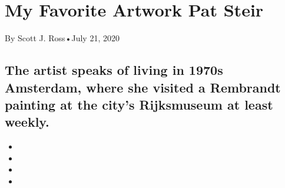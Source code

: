 \hypertarget{my-favorite-artwork--pat-steir-1}{%
\section{My Favorite Artwork \textbar{} Pat
Steir}\label{my-favorite-artwork--pat-steir-1}}

By Scott J. Ross•July 21, 2020

\hypertarget{the-artist-speaks-of-living-in-1970s-amsterdam-where-she-visited-a-rembrandt-painting-at-the-citys-rijksmuseum-at-least-weekly-1}{%
\subsection{The artist speaks of living in 1970s Amsterdam, where she
visited a Rembrandt painting at the city's Rijksmuseum at least
weekly.}\label{the-artist-speaks-of-living-in-1970s-amsterdam-where-she-visited-a-rembrandt-painting-at-the-citys-rijksmuseum-at-least-weekly-1}}

\begin{itemize}
\item
\item
\item
\item
\end{itemize}

